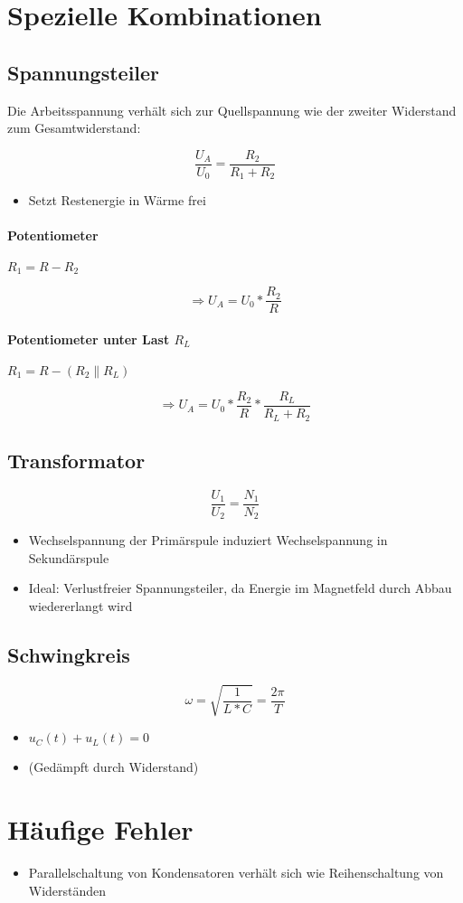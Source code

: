 \section{Spezielle Kombinationen}

\subsection{Spannungsteiler}

Die Arbeitsspannung verhält sich zur Quellspannung wie der zweiter Widerstand zum Gesamtwiderstand:

$$\frac{U_A}{U_0} = \frac{R_2}{R_1 + R_2}$$

\begin{itemize}
  \item Setzt Restenergie in Wärme frei
\end{itemize}

\paragraph{Potentiometer} $R_1 = R - R_2$

$$\Rightarrow U_A = U_0 * \frac{R_2}{R}$$

\paragraph{Potentiometer unter Last $R_L$}
$R_1 = R - (R_2 \parallel R_L)$

$$\Rightarrow U_A = U_0 * \frac{R_2}{R} * \frac{R_L}{R_L + R_2}$$

\subsection{Transformator}

$$\frac{U_1}{U_2} = \frac{N_1}{N_2}$$

\begin{itemize}
  \item Wechselspannung der Primärspule induziert Wechselspannung in Sekundärspule
  \item Ideal: Verlustfreier Spannungsteiler, da Energie im Magnetfeld durch Abbau wiedererlangt wird
\end{itemize}

\subsection{Schwingkreis}

$$\omega = \sqrt{\frac{1}{L * C}} = \frac{2\pi}{T}$$

\begin{itemize}
  \item $u_C(t) + u_L(t) = 0$
  \item (Gedämpft durch Widerstand)
\end{itemize}

\section{Häufige Fehler}

\begin{itemize}
  \item Parallelschaltung von Kondensatoren verhält sich wie Reihenschaltung von Widerständen
\end{itemize}